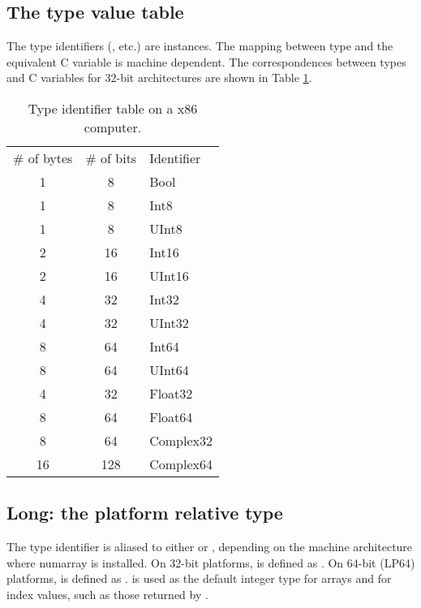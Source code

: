 \subsection{The type value table}
\label{sec:type-value-table}

The type identifiers (, etc.) are  instances.
The mapping between type and the equivalent C variable is machine dependent.
The correspondences between types and C variables for 32-bit architectures are
shown in Table \ref{tab:type-identifiers}.

\begin{table}[h]
   \centering
   \caption{Type identifier table on a x86 computer.}
   \label{tab:type-identifiers}
   \begin{tabular}{ccl}
      \# of bytes & \# of bits      & Identifier \\
           1      &       8         &   Bool \\
           1      &       8         &   Int8 \\
           1      &       8         &   UInt8 \\
           2      &       16        &   Int16 \\
           2      &       16        &   UInt16 \\
           4      &       32        &   Int32 \\
           4      &       32        &   UInt32 \\
           8      &       64        &   Int64 \\
           8      &       64        &   UInt64 \\
           4      &       32        &   Float32 \\
           8      &       64        &   Float64 \\
           8      &       64        &   Complex32 \\
           16     &      128        &   Complex64 
   \end{tabular}
\end{table}

\subsection{Long: the platform relative type}
The type identifier  is aliased to either  or
, depending on the machine architecture where numarray is
installed.  On 32-bit platforms,  is defined as .  On
64-bit (LP64) platforms,  is defined as . 
is used as the default integer type for arrays and for index values, such as
those returned by .  

